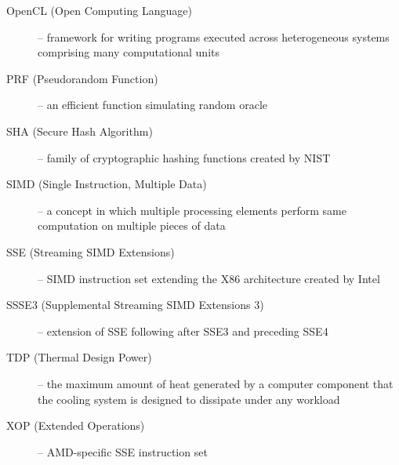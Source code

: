 \documentclass[nolof,digital]{fithesis3}
\begin{document}
\begin{description}
\item[OpenCL (Open Computing Language)] -- framework for writing programs executed across heterogeneous systems comprising many computational units

\item[PRF (Pseudorandom Function)] -- an efficient function simulating random oracle

\item[SHA (Secure Hash Algorithm)] -- family of cryptographic hashing functions created by NIST

\item[SIMD (Single Instruction, Multiple Data)] -- a concept in which multiple processing elements perform same computation on multiple pieces of data

\item[SSE (Streaming SIMD Extensions)] -- SIMD instruction set extending the X86 architecture created by Intel

\item[SSSE3 (Supplemental Streaming SIMD Extensions 3)] -- extension of SSE following after SSE3 and preceding SSE4

\item[TDP (Thermal Design Power)] -- the maximum amount of heat generated by a computer component that the cooling system is designed to dissipate under any workload

\item[XOP (Extended Operations)] -- AMD-specific SSE instruction set
\end{description}
\end{document}
